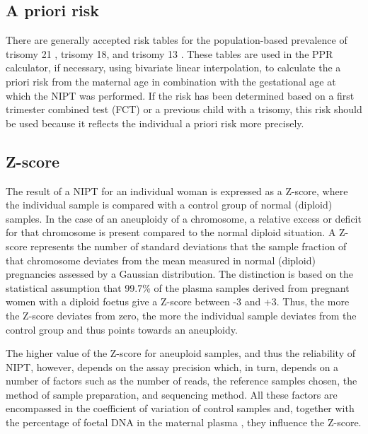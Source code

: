 \subsection{A priori risk}
There are generally accepted risk tables for the population-based prevalence of trisomy 21 \cite{Snijders_1999}, trisomy 18, and trisomy 13 \cite{Snijders_1995}. 
These tables are used in the PPR calculator, if necessary, using bivariate linear interpolation, to calculate the a priori risk from the maternal age in combination with the gestational age at which the NIPT was performed. 
If the risk has been determined based on a first trimester combined test (FCT) or a previous child with a trisomy, this risk should be used because it reflects the individual a priori risk more precisely.

\subsection{Z-score}
The result of a NIPT for an individual woman is expressed as a Z-score, where the individual sample is compared with a control group of normal (diploid) samples. 
In the case of an aneuploidy of a chromosome, a relative excess or deficit for that chromosome is present compared to the normal diploid situation. 
A Z-score represents the number of standard deviations that the sample fraction of that chromosome deviates from the mean measured in normal (diploid) pregnancies assessed by a Gaussian distribution. 
The distinction is based on the statistical assumption that 99.7\% of the plasma samples derived from pregnant women with a diploid foetus give a Z-score between -3 and +3. 
Thus, the more the Z-score deviates from zero, the more the individual sample deviates from the control group and thus points towards an aneuploidy.

The higher value of the Z-score for aneuploid samples, and thus the reliability of NIPT, however, depends on the assay precision which, in turn, depends on a number of factors such as the number of reads, the reference samples chosen, the method of sample preparation, and sequencing method. 
All these factors are encompassed in the coefficient of variation of control samples and, together with the percentage of foetal DNA in the maternal plasma \cite{Ashoor_2012b}, they influence the Z-score.

